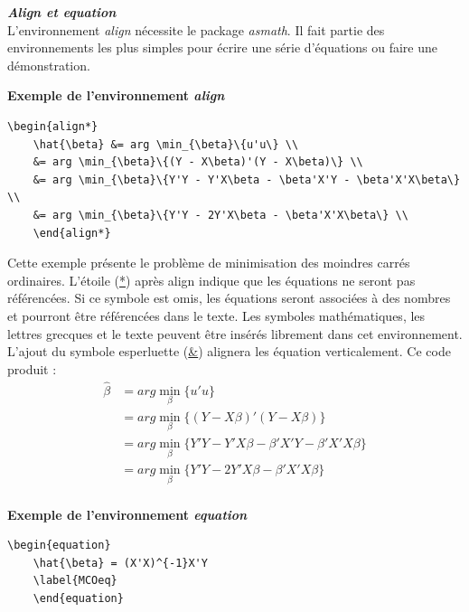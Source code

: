 \documentclass[12pt]{article}
\begin{document}
	\textbf{\textit{Align et equation}} \\ 
	
	L'environnement \textit{align} nécessite le package \textit{asmath}. Il fait partie des environnements les plus simples pour écrire une série d'équations ou faire une démonstration.
	
	\textbf{Exemple de l'environnement \textit{align}} \\
	\begin{lstlisting}[frame=single]
	\begin{align*}
	\hat{\beta} &= arg \min_{\beta}\{u'u\} \\
	&= arg \min_{\beta}\{(Y - X\beta)'(Y - X\beta)\} \\
	&= arg \min_{\beta}\{Y'Y - Y'X\beta - \beta'X'Y - \beta'X'X\beta\} \\
	&= arg \min_{\beta}\{Y'Y - 2Y'X\beta - \beta'X'X\beta\} \\
	\end{align*}
	\end{lstlisting}
	
	Cette exemple présente le problème de minimisation des moindres carrés ordinaires. L'étoile (\url{*}) après align indique que les équations ne seront pas référencées. Si ce symbole est omis, les équations seront associées à des nombres et pourront être référencées dans le texte. Les symboles mathématiques, les lettres grecques et le texte peuvent être insérés librement dans cet environnement. L'ajout du symbole esperluette (\url{&}) alignera les équation verticalement. Ce code produit :
	\begin{align*}
	\hat{\beta} &= arg \min_{\beta}\{u'u\} \\
	&= arg \min_{\beta}\{(Y - X\beta)'(Y - X\beta)\} \\
	&= arg \min_{\beta}\{Y'Y - Y'X\beta - \beta'X'Y - \beta'X'X\beta\} \\
	&= arg \min_{\beta}\{Y'Y - 2Y'X\beta - \beta'X'X\beta\} \\
	\end{align*}
	
	\textbf{Exemple de l'environnement \textit{equation}} \\
	
	\begin{lstlisting}[frame=single]
	\begin{equation}
	\hat{\beta} = (X'X)^{-1}X'Y
	\label{MCOeq}
	\end{equation}
	\end{lstlisting}
	
\end{document}
